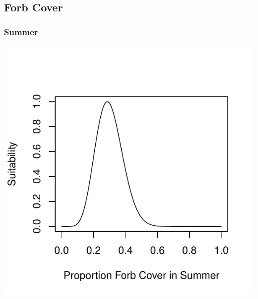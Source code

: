 \documentclass[12pt,letterpaper]{article}\usepackage{graphicx, color}
\makeatletter
\def\maxwidth{ %
  \ifdim\Gin@nat@width>\linewidth
    \linewidth
  \else
    \Gin@nat@width
  \fi
}
\newenvironment{knitrout}{}{} %
\makeatother
\begin{document}
\subsection{Forb Cover}
\subsubsection{Summer}
\begin{knitrout}
\color{fgcolor}\includegraphics[width=\maxwidth]{figure/Forb_Cover_Roy_Sum} 
\end{knitrout}
\end{document}
